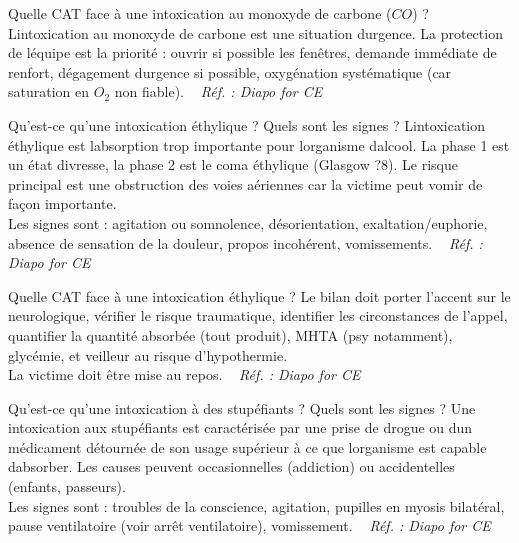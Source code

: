 \documentclass[grid,avery5371,landscape]{flashcards}
\makeatletter
\newcounter{nocarte}
\newcommand{\categ}[1]{%
  \def\@categ{#1}%
  \setcounter{nocarte}{0}%
}
\newcommand{\source}[1]{%
  \medskip
  \itshape%
   ~ \hfill Réf. : #1}
\makeatother
\begin{document}
\color[HTML]{01DF01}
\categ{CE-CP-REG}
\begin{flashcard}[CAT]{
 Quelle CAT face à une intoxication au monoxyde de carbone ($CO$) ?   }
  Lintoxication au monoxyde de carbone est une situation durgence. La protection de léquipe est la priorité : ouvrir si possible les fenêtres, demande immédiate de renfort, dégagement durgence si possible, oxygénation systématique (car saturation en $O_2$ non fiable).
  \source{Diapo for CE }
\end{flashcard}


\color[HTML]{01DF01}
\categ{CE-CP-REG}
\begin{flashcard}[bilan]{
 Qu'est-ce qu'une intoxication éthylique ? Quels sont les signes ?   }
  Lintoxication éthylique est labsorption trop importante pour lorganisme dalcool. La phase 1 est un état divresse, la phase 2 est le coma éthylique (Glasgow $?$8). Le risque principal est une obstruction des voies aériennes car la victime peut vomir de façon importante. \\
    Les signes sont : agitation ou somnolence, désorientation, exaltation/euphorie, absence de sensation de la douleur, propos incohérent, vomissements.
  \source{Diapo for CE }
\end{flashcard}


\color[HTML]{01DF01}
\categ{CE-CP-REG}
\begin{flashcard}[CAT]{
 Quelle CAT face à une intoxication éthylique ?   }
  Le bilan doit porter l'accent sur le neurologique, vérifier le risque traumatique, identifier les circonstances de l'appel, quantifier la quantité absorbée (tout produit), MHTA (psy notamment), glycémie, et veilleur au risque d'hypothermie. \\
    La victime doit être mise au repos.
  \source{Diapo for CE }
\end{flashcard}


\color[HTML]{01DF01}
\categ{CE-CP-REG}
\begin{flashcard}[bilan]{
 Qu'est-ce qu'une intoxication à des stupéfiants ?  Quels sont les signes ?   }
  Une intoxication aux stupéfiants est caractérisée par une prise de drogue ou dun médicament détournée de son usage supérieur à ce que lorganisme est capable dabsorber. Les causes peuvent occasionnelles (addiction) ou accidentelles (enfants, passeurs). \\
    Les signes sont : troubles de la conscience, agitation, pupilles en myosis bilatéral, pause ventilatoire (voir arrêt ventilatoire), vomissement.
  \source{Diapo for CE }
\end{flashcard}
\end{document}
